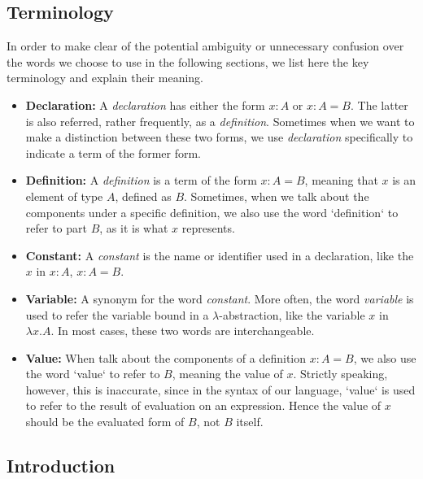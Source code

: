 \documentclass{article}
\theoremstyle{remark}
\begin{document}
\subsection{Terminology}
In order to make clear of the potential ambiguity or unnecessary confusion over the words we choose to use in the following sections, we list here the key terminology and explain their meaning.
\begin{itemize}
  \item \textbf{Declaration:} A \emph{declaration} has either the form $x : A$ or $x : A = B$. The latter is also referred, rather frequently, as a \emph{definition}. Sometimes when we want to make a distinction between these two forms, we use \emph{declaration} specifically to indicate a term of the former form. 
  \item \textbf{Definition:} A \emph{definition} is a term of the form $x : A = B$, meaning that $x$ is an element of type $A$, defined as $B$. Sometimes, when we talk about the components under a specific definition, we also use the word `definition` to refer to part $B$, as it is what $x$ represents.  
  \item \textbf{Constant:} A \emph{constant} is the name or identifier used in a declaration, like the $x$ in $x : A$, $x : A = B$.
  \item \textbf{Variable:} A synonym for the word \emph{constant}. More often, the word \emph{variable} is used to refer the variable bound in a $\lambda$-abstraction, like the variable $x$ in $\lambda x . A$. In most cases, these two words are interchangeable. 
  \item \textbf{Value:} When talk about the components of a definition $x : A = B$, we also use the word `value` to refer to $B$, meaning the value of $x$. Strictly speaking, however, this is inaccurate, since in the syntax of our language, `value` is used to refer to the result of evaluation on an expression. Hence the value of $x$ should be the evaluated form of $B$, not $B$ itself. 
\end{itemize}

\subsection{Introduction}
\end{document}
